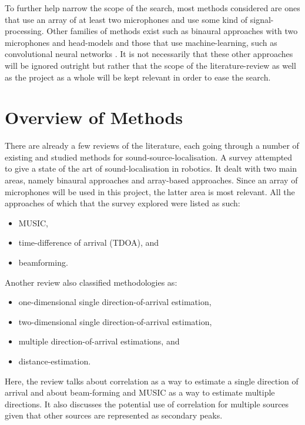 \documentclass{report}
\begin{document}
To further help narrow the scope of the search, most methods considered are ones that use an array of at least two microphones and use some kind of signal-processing. Other families of methods exist such as binaural approaches with two microphones and head-models \cite{argentieri_survey_2015} and those that use machine-learning, such as convolutional neural networks \cite{sakavicius_multiple_2022}. It is not necessarily that these other approaches will be ignored outright but rather that the scope of the literature-review as well as the project as a whole will be kept relevant in order to ease the search.

\section{Overview of Methods}

There are already a few reviews of the literature, each going through a number of existing and studied methods for sound-source-localisation. A survey \cite{argentieri_survey_2015} attempted to give a state of the art of sound-localisation in robotics. It dealt with two main areas, namely binaural approaches and array-based approaches. Since an array of microphones will be used in this project, the latter area is most relevant. All the approaches of which that the survey explored were listed as such:
\begin{itemize}
	\item MUSIC,
	\item time-difference of arrival (TDOA), and
	\item beamforming.
\end{itemize}

Another review \cite{rascon_localization_2017} also classified methodologies as:
\begin{itemize}
	\item one-dimensional single direction-of-arrival estimation,
	\item two-dimensional single direction-of-arrival estimation,
	\item multiple direction-of-arrival estimations, and
	\item distance-estimation.
\end{itemize}
Here, the review talks about correlation as a way to estimate a single direction of arrival and about beam-forming and MUSIC as a way to estimate multiple directions. It also discusses the potential use of correlation for multiple sources given that other sources are represented as secondary peaks. 
\end{document}
